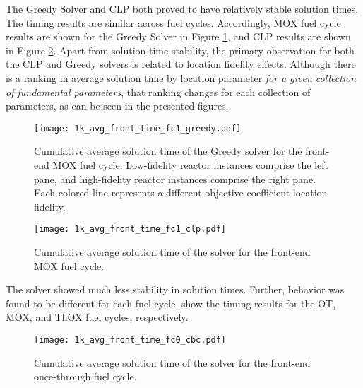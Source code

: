 The Greedy Solver and CLP both proved to have relatively stable solution
times. The timing results are similar across fuel cycles. Accordingly, MOX fuel
cycle results are shown for the Greedy Solver in Figure
\ref{fig:1k_avg_front_time_fc1_greedy}, and CLP results are shown in Figure
\ref{fig:1k_avg_front_time_fc1_clp}. Apart from solution time stability, the
primary observation for both the CLP and Greedy solvers is related to location
fidelity effects. Although there is a ranking in average solution time by
location parameter \textit{for a given collection of fundamental parameters},
that ranking changes for each collection of parameters, as can be seen in the
presented figures.

\begin{figure}[h!]
  \begin{center}
    \texttt{[image: 1k\_avg\_front\_time\_fc1\_greedy.pdf]}
    \caption{
      \label{fig:1k_avg_front_time_fc1_greedy}
      Cumulative average solution time of the Greedy solver for the front-end
      MOX fuel cycle. Low-fidelity reactor instances comprise the left pane, and
      high-fidelity reactor instances comprise the right pane. Each colored line
      represents a different objective coefficient location fidelity.}
  \end{center}
\end{figure}

\begin{figure}[h!]
  \begin{center}
    \texttt{[image: 1k\_avg\_front\_time\_fc1\_clp.pdf]}
    \caption{
      \label{fig:1k_avg_front_time_fc1_clp}
      Cumulative average solution time of the \clp solver for the front-end MOX fuel
      cycle.}
  \end{center}
\end{figure}

The \cbc solver showed much less stability in solution times. Further, behavior
was found to be different for each fuel
cycle. 
show the timing results for the OT, MOX, and ThOX fuel cycles,
respectively. 

\begin{figure}[h!]
  \begin{center}
    \texttt{[image: 1k\_avg\_front\_time\_fc0\_cbc.pdf]}
    \caption{
      \label{fig:1k_avg_front_time_fc0_cbc}
      Cumulative average solution time of the \cbc solver for the front-end
      once-through fuel cycle.}
  \end{center}
\end{figure}

